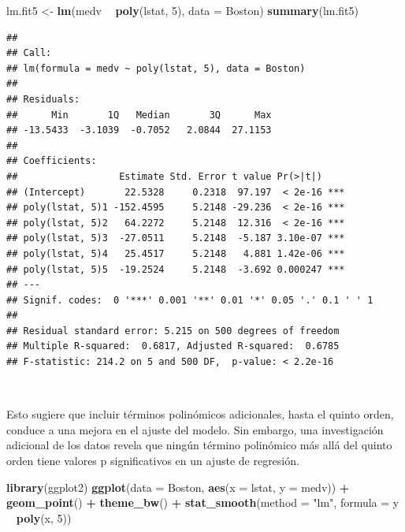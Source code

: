 \documentclass[]{book}
\newenvironment{Shaded}{\begin{snugshade}}{\end{snugshade}}
\newcommand{\KeywordTok}[1]{\textcolor[rgb]{0.13,0.29,0.53}{\textbf{#1}}}
\newcommand{\DataTypeTok}[1]{\textcolor[rgb]{0.13,0.29,0.53}{#1}}
\newcommand{\DecValTok}[1]{\textcolor[rgb]{0.00,0.00,0.81}{#1}}
\newcommand{\StringTok}[1]{\textcolor[rgb]{0.31,0.60,0.02}{#1}}
\newcommand{\OperatorTok}[1]{\textcolor[rgb]{0.81,0.36,0.00}{\textbf{#1}}}
\newcommand{\NormalTok}[1]{#1}
\begin{document}
\begin{Shaded}
\begin{Highlighting}[]
\NormalTok{lm.fit5 <-}\StringTok{ }\KeywordTok{lm}\NormalTok{(medv }\OperatorTok{~}\StringTok{ }\KeywordTok{poly}\NormalTok{(lstat, }\DecValTok{5}\NormalTok{), }\DataTypeTok{data =}\NormalTok{ Boston)}
\KeywordTok{summary}\NormalTok{(lm.fit5)}
\end{Highlighting}
\end{Shaded}

\begin{verbatim}
## 
## Call:
## lm(formula = medv ~ poly(lstat, 5), data = Boston)
## 
## Residuals:
##      Min       1Q   Median       3Q      Max 
## -13.5433  -3.1039  -0.7052   2.0844  27.1153 
## 
## Coefficients:
##                  Estimate Std. Error t value Pr(>|t|)    
## (Intercept)       22.5328     0.2318  97.197  < 2e-16 ***
## poly(lstat, 5)1 -152.4595     5.2148 -29.236  < 2e-16 ***
## poly(lstat, 5)2   64.2272     5.2148  12.316  < 2e-16 ***
## poly(lstat, 5)3  -27.0511     5.2148  -5.187 3.10e-07 ***
## poly(lstat, 5)4   25.4517     5.2148   4.881 1.42e-06 ***
## poly(lstat, 5)5  -19.2524     5.2148  -3.692 0.000247 ***
## ---
## Signif. codes:  0 '***' 0.001 '**' 0.01 '*' 0.05 '.' 0.1 ' ' 1
## 
## Residual standard error: 5.215 on 500 degrees of freedom
## Multiple R-squared:  0.6817, Adjusted R-squared:  0.6785 
## F-statistic: 214.2 on 5 and 500 DF,  p-value: < 2.2e-16
\end{verbatim}

~

Esto sugiere que incluir términos polinómicos adicionales, hasta el
quinto orden, conduce a una mejora en el ajuste del modelo. Sin embargo,
una investigación adicional de los datos revela que ningún término
polinómico más allá del quinto orden tiene valores p significativos en
un ajuste de regresión.

\begin{Shaded}
\begin{Highlighting}[]
\KeywordTok{library}\NormalTok{(ggplot2)}
\KeywordTok{ggplot}\NormalTok{(}\DataTypeTok{data =}\NormalTok{ Boston, }\KeywordTok{aes}\NormalTok{(}\DataTypeTok{x =}\NormalTok{ lstat, }\DataTypeTok{y =}\NormalTok{ medv)) }\OperatorTok{+}\StringTok{ }
\StringTok{  }\KeywordTok{geom_point}\NormalTok{() }\OperatorTok{+}\StringTok{ }
\StringTok{  }\KeywordTok{theme_bw}\NormalTok{() }\OperatorTok{+}\StringTok{ }
\StringTok{  }\KeywordTok{stat_smooth}\NormalTok{(}\DataTypeTok{method =} \StringTok{"lm"}\NormalTok{, }\DataTypeTok{formula =}\NormalTok{ y }\OperatorTok{~}\StringTok{ }\KeywordTok{poly}\NormalTok{(x, }\DecValTok{5}\NormalTok{))}
\end{Highlighting}
\end{Shaded}
\end{document}
